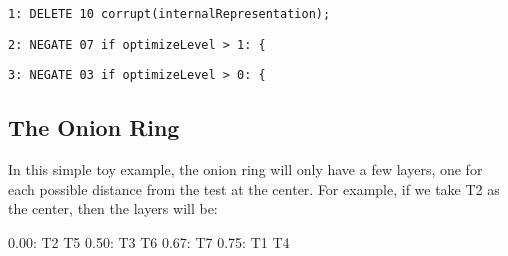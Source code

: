 { {\tt 1: DELETE  10                corrupt(internalRepresentation);}}

{{\tt 2: NEGATE  07       if optimizeLevel > 1: \{}}

{ {\tt 3: NEGATE  03    if optimizeLevel > 0: \{}}

\subsection{The Onion Ring}

In this simple toy example, the onion ring will only have a few
layers, one for each possible distance from the test at the center.
For example, if we take T2 as the center, then the layers will be:

\begin{code}
 0.00:  T2 T5
 0.50:  T3 T6
 0.67:  T7
 0.75:  T1 T4
\end{code}